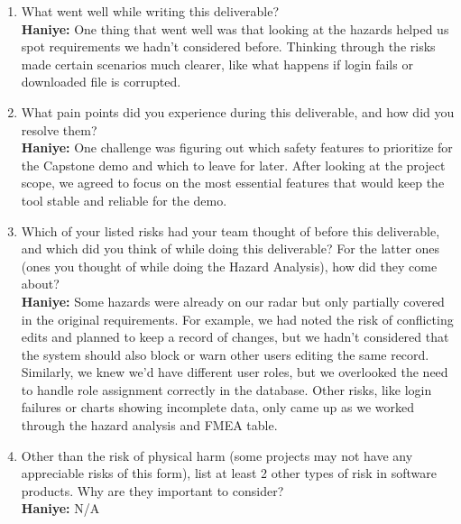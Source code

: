 \documentclass{article}
\begin{document}
\begin{enumerate}
    \item What went well while writing this deliverable?
    \\\textbf{Haniye:} One thing that went well was that looking at the hazards helped us spot requirements we hadn’t considered before. Thinking through the risks made certain scenarios much clearer, like what happens if login fails or downloaded file is corrupted.
    \item What pain points did you experience during this deliverable, and how
    did you resolve them?
    \\\textbf{Haniye:} One challenge was figuring out which safety features to prioritize for the Capstone demo and which to leave for later. After looking at the project scope, we agreed to focus on the most essential features that would keep the tool stable and reliable for the demo.
    \item Which of your listed risks had your team thought of before this
    deliverable, and which did you think of while doing this deliverable? For
    the latter ones (ones you thought of while doing the Hazard Analysis), how
    did they come about?
    \\\textbf{Haniye:} Some hazards were already on our radar but only partially covered in the original requirements. For example, we had noted the risk of conflicting edits and planned to keep a record of changes, but we hadn’t considered that the system should also block or warn other users editing the same record. Similarly, we knew we’d have different user roles, but we overlooked the need to handle role assignment correctly in the database. Other risks, like login failures or charts showing incomplete data, only came up as we worked through the hazard analysis and FMEA table.
    \item Other than the risk of physical harm (some projects may not have any
    appreciable risks of this form), list at least 2 other types of risk in
    software products. Why are they important to consider?
    \\\textbf{Haniye:} N/A
\end{enumerate}
\end{document}
